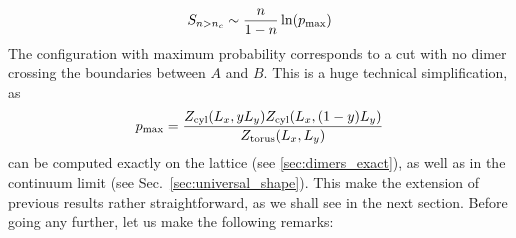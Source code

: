 \documentclass[11pt]{iopart}
\begin{document}
\begin{equation}
 S_{n>n_c}\sim \frac{n}{1-n}\ln (p_{\rm max})
\end{equation}
The configuration with maximum probability corresponds to a cut with no dimer crossing the boundaries between $A$ and $B$. This is a huge technical simplification, as
\begin{equation}\label{eq:pmax}
 p_{\rm max}=\frac{Z_{\rm cyl}(L_x,y L_y)Z_{\rm cyl}(L_x,(1-y)L_y)}{Z_{\rm torus}(L_x,L_y)}
\end{equation}
can be computed exactly on the lattice (see \ref{sec:dimers_exact}), as well as in the continuum limit (see Sec.~\ref{sec:universal_shape}). This make the extension of previous results\cite{Misguich,Stephan11} rather straightforward, as we shall see in the next section. Before going any further, let us make the following remarks:
\end{document}
